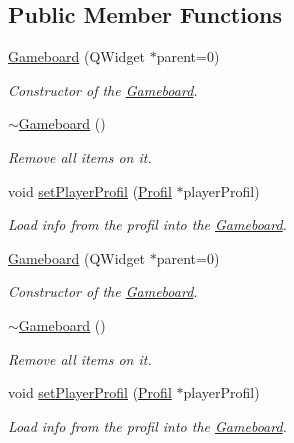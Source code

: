 \subsection*{Public Member Functions}
\begin{DoxyCompactItemize}
\item 
\hyperlink{class_gameboard_a82157069ecfab2d2245b7d5df563aaae}{Gameboard} (Q\+Widget $\ast$parent=0)
\begin{DoxyCompactList}\small\item\em Constructor of the \hyperlink{class_gameboard}{Gameboard}. \end{DoxyCompactList}\item 
\hypertarget{class_gameboard_a4387b654115aa01bd309e5e0b6c8724a}{}\hyperlink{class_gameboard_a4387b654115aa01bd309e5e0b6c8724a}{$\sim$\+Gameboard} ()\label{class_gameboard_a4387b654115aa01bd309e5e0b6c8724a}

\begin{DoxyCompactList}\small\item\em Remove all items on it. \end{DoxyCompactList}\item 
void \hyperlink{class_gameboard_a7ac10eb79b85cecff7fdeda1f31e980b}{set\+Player\+Profil} (\hyperlink{class_profil}{Profil} $\ast$player\+Profil)
\begin{DoxyCompactList}\small\item\em Load info from the profil into the \hyperlink{class_gameboard}{Gameboard}. \end{DoxyCompactList}\item 
\hyperlink{class_gameboard_a82157069ecfab2d2245b7d5df563aaae}{Gameboard} (Q\+Widget $\ast$parent=0)
\begin{DoxyCompactList}\small\item\em Constructor of the \hyperlink{class_gameboard}{Gameboard}. \end{DoxyCompactList}\item 
\hypertarget{class_gameboard_a4387b654115aa01bd309e5e0b6c8724a}{}\hyperlink{class_gameboard_a4387b654115aa01bd309e5e0b6c8724a}{$\sim$\+Gameboard} ()\label{class_gameboard_a4387b654115aa01bd309e5e0b6c8724a}

\begin{DoxyCompactList}\small\item\em Remove all items on it. \end{DoxyCompactList}\item 
void \hyperlink{class_gameboard_a7ac10eb79b85cecff7fdeda1f31e980b}{set\+Player\+Profil} (\hyperlink{class_profil}{Profil} $\ast$player\+Profil)
\begin{DoxyCompactList}\small\item\em Load info from the profil into the \hyperlink{class_gameboard}{Gameboard}. \end{DoxyCompactList}\end{DoxyCompactItemize}

